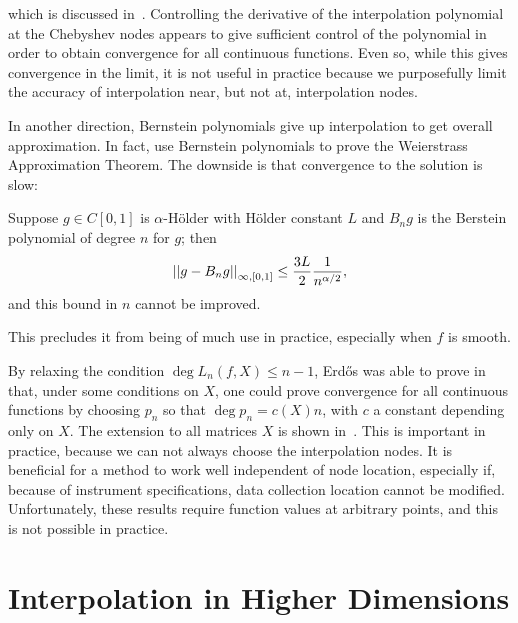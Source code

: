 \noindent
which is discussed in~\cite[Chapter 6]{interpFunctionsBook}.
Controlling the derivative of the interpolation polynomial
at the Chebyshev nodes appears to give sufficient control of the polynomial
in order to obtain convergence for all continuous functions.
Even so, while this gives convergence in the limit,
it is not useful in practice because we purposefully limit the
accuracy of interpolation near, but not at, interpolation nodes.

In another direction, Bernstein polynomials give up interpolation
to get overall approximation.
In fact, \cite{davis_interpolation,rivlin2003introduction}
use Bernstein polynomials to prove the Weierstrass Approximation Theorem.
The downside is that convergence to the solution is slow:

\clearpage

\begin{thm}
\label{thm:berstein_polynomial_error}
Suppose $g\in C[0,1]$ is $\alpha$-H\"{o}lder
with H\"{o}lder constant $L$ and $B_{n}g$ is the Berstein
polynomial of degree $n$ for $g$; then 
%
\begin{equation}
    \left| \left| g - B_{n}g \right| \right|_{\infty,[0,1]} \le
        \frac{3L}{2}\frac{1}{n^{\alpha/2}},
\end{equation}
%
and this bound in $n$ cannot be improved.
\end{thm}

\noindent
This precludes it from being of much use in practice,
especially when $f$ is smooth.

By relaxing the condition $\deg L_{n}(f,X) \le n-1$,
Erd\H{o}s was able to prove in~\cite{erdos1943some} that,
under some conditions on $X$, one could prove convergence
for all continuous functions by choosing $p_{n}$ so that
$\deg p_{n} = c(X)n$, with $c$ a constant depending only on $X$.
The extension to all matrices $X$ is shown
in~\cite[Theorem 2.7]{interpFunctionsBook}.
This is important in practice, because we can not
always choose the interpolation nodes.
It is beneficial for a method to work well independent of
node location, especially if, because of instrument specifications,
data collection location cannot be modified.
Unfortunately, these results require function values at arbitrary points,
and this is not possible in practice.



\section{Interpolation in Higher Dimensions}
\label{sec:Interp_MD}

